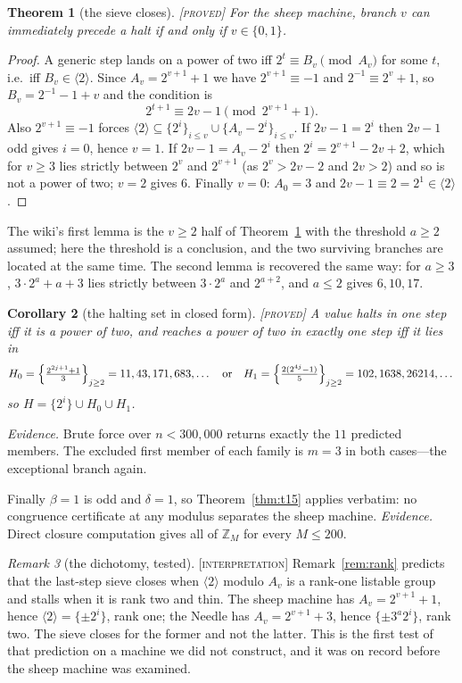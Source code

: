 \documentclass[11pt]{article}
\newtheorem{theorem}{Theorem}[section]
\newtheorem{corollary}[theorem]{Corollary}
\theoremstyle{definition}
\theoremstyle{remark}
\newtheorem{remark}[theorem]{Remark}
\newcommand{\Z}{\mathbb{Z}}
\newcommand{\Proved}{\textsc{[proved]}}
\newcommand{\Interp}{\textsc{[interpretation]}}
\begin{document}
\begin{theorem}[the sieve closes]\label{thm:sheep-sieve}
\Proved\; For the sheep machine, branch $v$ can immediately precede a halt if
and only if $v\in\{0,1\}$.
\end{theorem}

\begin{proof}
A generic step lands on a power of two iff $2^t\equiv B_v \pmod{A_v}$ for some
$t$, i.e.\ iff $B_v\in\langle2\rangle$.  Since $A_v=2^{v+1}+1$ we have
$2^{v+1}\equiv-1$ and $2^{-1}\equiv2^v+1$, so $B_v=2^{-1}-1+v$ and the
condition is
\[
2^{t+1}\equiv 2v-1 \pmod{2^{v+1}+1}.
\]
Also $2^{v+1}\equiv-1$ forces
$\langle2\rangle\subseteq\{2^i\}_{i\le v}\cup\{A_v-2^i\}_{i\le v}$.  If
$2v-1=2^i$ then $2v-1$ odd gives $i=0$, hence $v=1$.  If $2v-1=A_v-2^i$ then
$2^i=2^{v+1}-2v+2$, which for $v\ge3$ lies strictly between $2^v$ and
$2^{v+1}$ (as $2^v>2v-2$ and $2v>2$) and so is not a power of two; $v=2$ gives
$6$.  Finally $v=0$: $A_0=3$ and $2v-1\equiv2=2^1\in\langle2\rangle$.
\end{proof}

The wiki's first lemma is the $v\ge2$ half of Theorem~\ref{thm:sheep-sieve}
with the threshold $a\ge2$ assumed; here the threshold is a conclusion, and
the two surviving branches are located at the same time.  The second lemma is
recovered the same way: for $a\ge3$, $3\cdot2^a+a+3$ lies strictly between
$3\cdot2^a$ and $2^{a+2}$, and $a\le2$ gives $6,10,17$.

\begin{corollary}[the halting set in closed form]\label{cor:sheep-H}
\Proved\; A value halts in one step iff it is a power of two, and reaches a
power of two in exactly one step iff it lies in
\[
H_0=\Bigl\{\tfrac{2^{2j+1}+1}{3}\Bigr\}_{j\ge2}=11,43,171,683,\dots
\quad\text{or}\quad
H_1=\Bigl\{\tfrac{2(2^{4j}-1)}{5}\Bigr\}_{j\ge2}=102,1638,26214,\dots
\]
so $H=\{2^i\}\cup H_0\cup H_1$.
\end{corollary}

\emph{Evidence.}  Brute force over $n<300{,}000$ returns exactly the $11$
predicted members.  The excluded first member of each family is $m=3$ in both
cases---the exceptional branch again.

Finally $\beta=1$ is odd and $\delta=1$, so Theorem~\ref{thm:t15} applies
verbatim: no congruence certificate at any modulus separates the sheep
machine.  \emph{Evidence.}  Direct closure computation gives all of $\Z_M$
for every $M\le200$.

\begin{remark}[the dichotomy, tested]\label{rem:sheep-dichotomy}
\Interp\; Remark~\ref{rem:rank} predicts that the last-step sieve closes when
$\langle2\rangle$ modulo $A_v$ is a rank-one listable group and stalls when it
is rank two and thin.  The sheep machine has $A_v=2^{v+1}+1$, hence
$\langle2\rangle=\{\pm2^i\}$, rank one; the Needle has $A_v=2^{v+1}+3$, hence
$\{\pm3^a2^i\}$, rank two.  The sieve closes for the former and not the
latter.  This is the first test of that prediction on a machine we did not
construct, and it was on record before the sheep machine was examined.
\end{remark}
\end{document}
